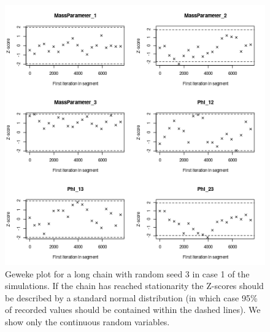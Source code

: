 \documentclass[12pt]{article} %
\begin{document}
	\newpage

	\begin{figure}[!htb]
			\centering
			\includegraphics[scale=0.65]{Images/Gen_data/Case_1/Geweke_plot_3.png}
			\caption{Geweke plot \cite{GewekeEvaluatingAccuracySamplingBased} for a long chain with random seed 3 in case 1 of the simulations. If the chain has reached stationarity the Z-scores should be described by a standard normal distribution (in which case 95\% of recorded values should be contained within the dashed lines). We show only the continuous random variables.}
			\label{fig:gen_data_case_1_geweke_plot_3}
		\end{figure}
		
	\newpage
	
\end{document}
